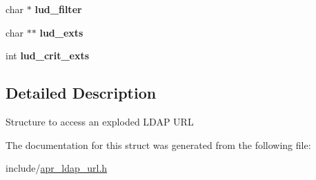\begin{DoxyCompactItemize}
\item 
\hypertarget{structapr__ldap__url__desc__t_a91351831634594ede669c31ae89c9a19}{char $\ast$ {\bfseries lud\-\_\-filter}}\label{structapr__ldap__url__desc__t_a91351831634594ede669c31ae89c9a19}

\item 
\hypertarget{structapr__ldap__url__desc__t_a2c660abf171c6598ba167edc5600e1e0}{char $\ast$$\ast$ {\bfseries lud\-\_\-exts}}\label{structapr__ldap__url__desc__t_a2c660abf171c6598ba167edc5600e1e0}

\item 
\hypertarget{structapr__ldap__url__desc__t_a824b9842afb077b7b192344dcb2e3787}{int {\bfseries lud\-\_\-crit\-\_\-exts}}\label{structapr__ldap__url__desc__t_a824b9842afb077b7b192344dcb2e3787}

\end{DoxyCompactItemize}


\subsection{Detailed Description}
Structure to access an exploded L\-D\-A\-P U\-R\-L 

The documentation for this struct was generated from the following file\-:\begin{DoxyCompactItemize}
\item 
include/\hyperlink{apr__ldap__url_8h}{apr\-\_\-ldap\-\_\-url.\-h}\end{DoxyCompactItemize}
